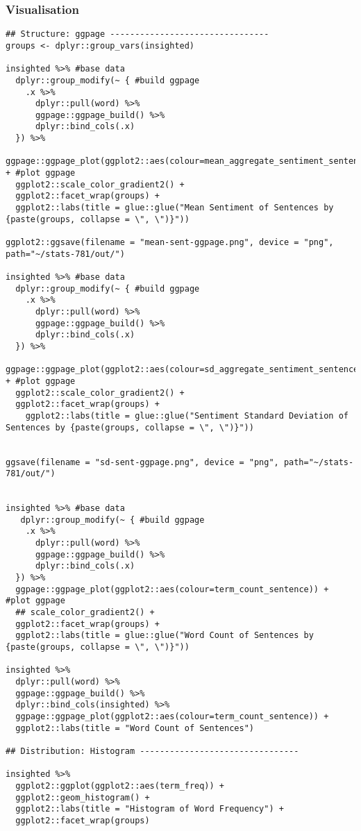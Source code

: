 \documentclass[a4paper, 11pt]{article}
\begin{document}
\subsubsection{Visualisation}
\label{sec:orga353ac7}
\begin{verbatim}
## Structure: ggpage --------------------------------
groups <- dplyr::group_vars(insighted)

insighted %>% #base data
  dplyr::group_modify(~ { #build ggpage
    .x %>%
      dplyr::pull(word) %>%
      ggpage::ggpage_build() %>%
      dplyr::bind_cols(.x)  
  }) %>%
  ggpage::ggpage_plot(ggplot2::aes(colour=mean_aggregate_sentiment_sentence)) + #plot ggpage
  ggplot2::scale_color_gradient2() +
  ggplot2::facet_wrap(groups) +
  ggplot2::labs(title = glue::glue("Mean Sentiment of Sentences by {paste(groups, collapse = \", \")}"))

ggplot2::ggsave(filename = "mean-sent-ggpage.png", device = "png", path="~/stats-781/out/")

insighted %>% #base data
  dplyr::group_modify(~ { #build ggpage
    .x %>%
      dplyr::pull(word) %>%
      ggpage::ggpage_build() %>%
      dplyr::bind_cols(.x)  
  }) %>%
  ggpage::ggpage_plot(ggplot2::aes(colour=sd_aggregate_sentiment_sentence)) + #plot ggpage
  ggplot2::scale_color_gradient2() +
  ggplot2::facet_wrap(groups) +
    ggplot2::labs(title = glue::glue("Sentiment Standard Deviation of Sentences by {paste(groups, collapse = \", \")}"))


ggsave(filename = "sd-sent-ggpage.png", device = "png", path="~/stats-781/out/")


insighted %>% #base data
   dplyr::group_modify(~ { #build ggpage
    .x %>%
      dplyr::pull(word) %>%
      ggpage::ggpage_build() %>%
      dplyr::bind_cols(.x)  
  }) %>%
  ggpage::ggpage_plot(ggplot2::aes(colour=term_count_sentence)) + #plot ggpage
  ## scale_color_gradient2() +
  ggplot2::facet_wrap(groups) +
  ggplot2::labs(title = glue::glue("Word Count of Sentences by {paste(groups, collapse = \", \")}"))

insighted %>%
  dplyr::pull(word) %>%
  ggpage::ggpage_build() %>%
  dplyr::bind_cols(insighted) %>%
  ggpage::ggpage_plot(ggplot2::aes(colour=term_count_sentence)) +
  ggplot2::labs(title = "Word Count of Sentences")

## Distribution: Histogram --------------------------------

insighted %>%
  ggplot2::ggplot(ggplot2::aes(term_freq)) +
  ggplot2::geom_histogram() +
  ggplot2::labs(title = "Histogram of Word Frequency") +
  ggplot2::facet_wrap(groups)


\end{verbatim}
\end{document}
